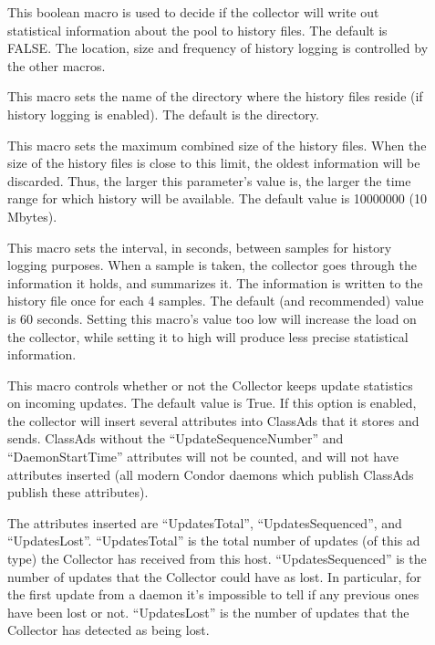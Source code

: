 \begin{description}
\item[] \label{param:KeepPoolHistory}
  This boolean macro is used to decide if the collector will write
  out statistical information about the pool to history files. The default
  is FALSE. The location, size and frequency of history logging is controlled
  by the other macros.

\item[] \label{param:PoolHistoryDir}
  This macro sets the name of the directory where the history
  files reside (if history logging is enabled).
  The default is the  directory.

\item[]
  \label{param:PoolHistoryMaxStorage} 
  This macro sets the maximum combined size of the history files.
  When the size of the history files is close to this limit, the oldest
  information will be discarded.
  Thus, the larger this parameter's value is, the larger the time
  range for which history will be available.  The default value is
  10000000 (10 Mbytes).

\item[]
  \label{param:PoolHistorySamplingInterval}
  This macro sets the interval, in seconds, between samples for
  history logging purposes. 
  When a sample is taken, the collector goes through the information
  it holds, and summarizes it.
  The information is written to the history file once for each 4
  samples.
  The default (and recommended) value is 60 seconds. Setting this
  macro's value too low will increase the load on the collector,
  while setting it to high will produce less precise statistical
  information.

\item[]
  \label{param:CollectorDaemonStats}
  This macro controls whether or not the Collector keeps update
  statistics on incoming updates.  The default value is True.  If
  this option is enabled, the collector will insert several attributes
  into ClassAds that it stores and sends.  ClassAds without the
  ``UpdateSequenceNumber'' and ``DaemonStartTime'' attributes will not
  be counted, and will not have attributes inserted (all modern Condor
  daemons which publish ClassAds publish these attributes).

  The attributes inserted are ``UpdatesTotal'', ``UpdatesSequenced'',
  and ``UpdatesLost''.  ``UpdatesTotal'' is the total number of
  updates (of this ad type) the Collector has received from this host.
  ``UpdatesSequenced'' is the number of updates that the Collector
  could have as lost.  In particular, for the first update from a
  daemon it's impossible to tell if any previous ones have been lost
  or not.  ``UpdatesLost'' is the number of updates that the Collector
  has detected as being lost.


\end{description}
